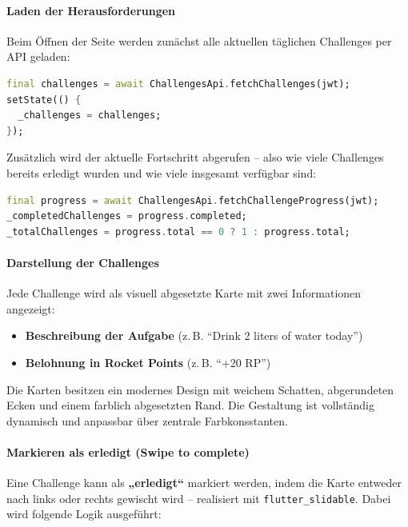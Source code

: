 \documentclass[11pt,a4paper]{article}
\begin{document}
\paragraph{Laden der Herausforderungen}
Beim Öffnen der Seite werden zunächst alle aktuellen täglichen Challenges per API geladen:

\begin{lstlisting}[language=Dart, caption=Laden der Tages-Challenges vom Server]
final challenges = await ChallengesApi.fetchChallenges(jwt);
setState(() {
  _challenges = challenges;
});
\end{lstlisting}

Zusätzlich wird der aktuelle Fortschritt abgerufen – also wie viele Challenges bereits erledigt wurden und wie viele insgesamt verfügbar sind:

\begin{lstlisting}[language=Dart, caption=Abfrage des Challenge-Fortschritts]
final progress = await ChallengesApi.fetchChallengeProgress(jwt);
_completedChallenges = progress.completed;
_totalChallenges = progress.total == 0 ? 1 : progress.total;
\end{lstlisting}

\paragraph{Darstellung der Challenges}
Jede Challenge wird als visuell abgesetzte Karte mit zwei Informationen angezeigt:
\begin{itemize}
    \item \textbf{Beschreibung der Aufgabe} (z.\,B. ``Drink 2 liters of water today'')
    \item \textbf{Belohnung in Rocket Points} (z.\,B. ``+20 RP'')
\end{itemize}

Die Karten besitzen ein modernes Design mit weichem Schatten, abgerundeten Ecken und einem farblich abgesetzten Rand. Die Gestaltung ist vollständig dynamisch und anpassbar über zentrale Farbkonsstanten.

\paragraph{Markieren als erledigt (Swipe to complete)}
Eine Challenge kann als \textbf{„erledigt“} markiert werden, indem die Karte entweder nach links oder rechts gewischt wird – realisiert mit \texttt{flutter\_slidable}. Dabei wird folgende Logik ausgeführt:
\end{document}
